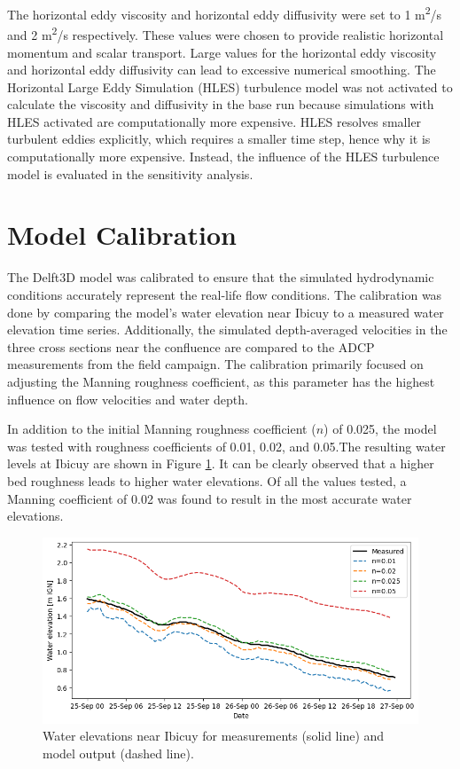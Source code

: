 The horizontal eddy viscosity and horizontal eddy diffusivity were set to 1 m\textsuperscript{2}/s and 2 m\textsuperscript{2}/s respectively. These values were chosen to provide realistic horizontal momentum and scalar transport. Large values for the horizontal eddy viscosity and horizontal eddy diffusivity can lead to excessive numerical smoothing. The  Horizontal Large Eddy Simulation (HLES) turbulence model was not activated to calculate the viscosity and diffusivity in the base run because simulations with HLES activated are computationally more expensive. HLES resolves smaller turbulent eddies explicitly, which requires a smaller time step, hence why it is computationally more expensive. Instead, the influence of the HLES turbulence model is evaluated in the sensitivity analysis.

\section{Model Calibration}
\label{sec:Delft3D calibration}
The Delft3D model was calibrated to ensure that the simulated hydrodynamic conditions accurately represent the real-life flow conditions. The calibration was done by comparing the model's water elevation near Ibicuy to a measured water elevation time series. Additionally, the simulated depth-averaged velocities in the three cross sections near the confluence are compared to the ADCP measurements from the field campaign. The calibration primarily focused on adjusting the Manning roughness coefficient, as this parameter has the highest influence on flow velocities and water depth.

In addition to the initial Manning roughness coefficient ($n$) of 0.025, the model was tested with roughness coefficients of 0.01, 0.02, and 0.05.The resulting water levels at Ibicuy are shown in Figure \ref{fig: WL calibration}. It can be clearly observed that a higher bed roughness leads to higher water elevations. Of all the values tested, a Manning coefficient of 0.02 was found to result in the most accurate water elevations.

\begin{figure}[H]
    \centering
    \includegraphics[width=1\linewidth]{figures/ch7/WL_calibration.png}
    \caption{Water elevations near Ibicuy for measurements (solid line) and model output (dashed line).}
    \label{fig: WL calibration}
\end{figure}


